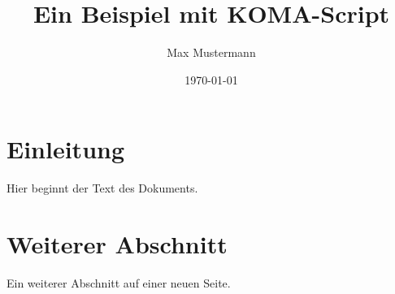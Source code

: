 \documentclass{scrartcl} %
\begin{document}
\title{Ein Beispiel mit KOMA-Script}
\author{Max Mustermann}
\date{\today}
\maketitle

\newpage
\section{Einleitung}
Hier beginnt der Text des Dokuments.

\newpage
\section{Weiterer Abschnitt}
Ein weiterer Abschnitt auf einer neuen Seite.
\end{document}

